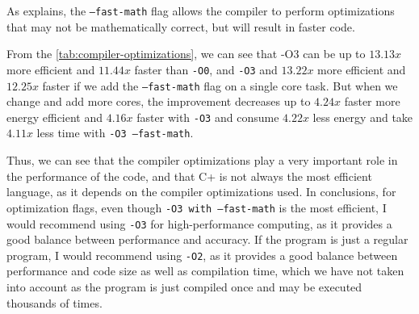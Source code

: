 As \autocite{llvm-fast-math} explains, the \texttt{--fast-math} flag allows the compiler to perform optimizations that may not be mathematically correct, but will result in faster code. 





From the \autoref{tab:compiler-optimizations}, we can see that -O3 can be up to $13.13x$ more efficient and $11.44x$ faster than \texttt{-O0}, and \texttt{-O3} and $13.22x$ more efficient and $12.25x$ faster if we add the \texttt{--fast-math} flag on a single core task. But when we change and add more cores, the improvement decreases up to $4.24x$ faster more energy efficient and $4.16x$ faster with \texttt{-O3} and consume $4.22x$ less energy and take $4.11x$ less time with \texttt{-O3 --fast-math}.

Thus, we can see that the compiler optimizations play a very important role in the performance of the code, and that C\++ is not always the most efficient language, as it depends on the compiler optimizations used. In conclusions, for optimization flags, even though \texttt{-O3 with --fast-math} is the most efficient, I would recommend using \texttt{-O3} for high-performance computing, as it provides a good balance between performance and accuracy. If the program is just a regular program, I would recommend using \texttt{-O2}, as it provides a good balance between performance and code size as well as compilation time, which we have not taken into account as the program is just compiled once and may be executed thousands of times.
